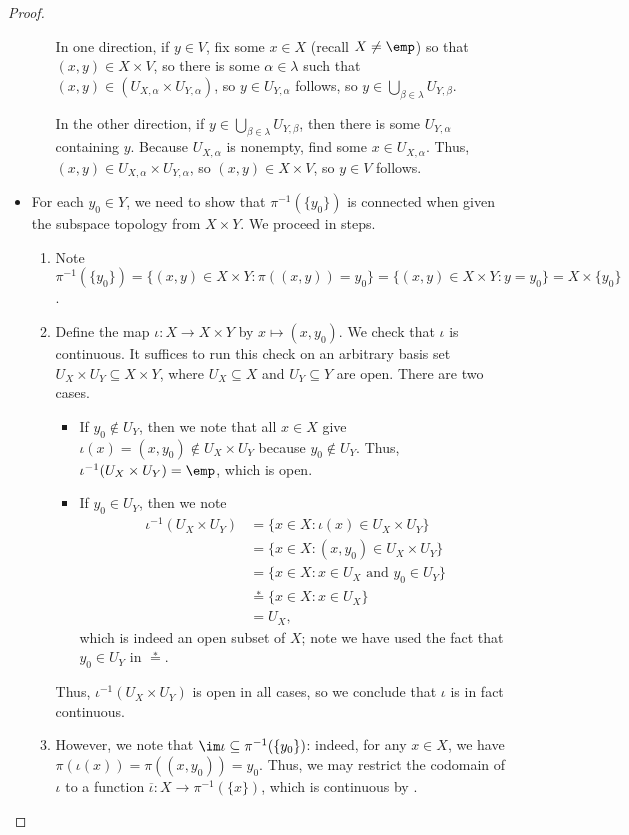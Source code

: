 \documentclass[../notes.tex]{subfiles}
\begin{document}
\begin{proof}
\begin{itemize}
\begin{itemize}
			In one direction, if $y\in V$, fix some $x\in X$ (recall $X\ne\emp$) so that $(x,y)\in X\times V$, so there is some $\alpha\in\lambda$ such that $(x,y)\in(U_{X,\alpha}\times U_{Y,\alpha})$, so $y\in U_{Y,\alpha}$ follows, so $y\in\bigcup_{\beta\in\lambda}U_{Y,\beta}$.

			In the other direction, if $y\in\bigcup_{\beta\in\lambda}U_{Y,\beta}$, then there is some $U_{Y,\alpha}$ containing $y$. Because $U_{X,\alpha}$ is nonempty, find some $x\in U_{X,\alpha}$. Thus, $(x,y)\in U_{X,\alpha}\times U_{Y,\alpha}$, so $(x,y)\in X\times V$, so $y\in V$ follows.
		\end{itemize}
		\item For each $y_0\in Y$, we need to show that $\pi^{-1}(\{y_0\})$ is connected when given the subspace topology from $X\times Y$. We proceed in steps.
		\begin{enumerate}
			\item Note $\pi^{-1}(\{y_0\})=\{(x,y)\in X\times Y:\pi((x,y))=y_0\}=\{(x,y)\in X\times Y:y=y_0\}=X\times\{y_0\}$.
			\item {Define the map $\iota\colon X\to X\times Y$ by $x\mapsto(x,y_0)$.} We check that $\iota$ is continuous. It suffices to run this check on an arbitrary basis set $U_X\times U_Y\subseteq X\times Y$, where $U_X\subseteq X$ and $U_Y\subseteq Y$ are open. There are two cases.
			\begin{itemize}
				\item If $y_0\notin U_Y$, then we note that all $x\in X$ give $\iota(x)=(x,y_0)\notin U_X\times U_Y$ because $y_0\notin U_Y$. Thus, $\iota^{-1}(U_X\times U_Y)=\emp$, which is open.
				\item If $y_0\in U_Y$, then we note
				\begin{align*}
					\iota^{-1}(U_X\times U_Y) &= \{x\in X:\iota(x)\in U_X\times U_Y\} \\
					&= \{x\in X:(x,y_0)\in U_X\times U_Y\} \\
					&= \{x\in X:x\in U_X\text{ and }y_0\in U_Y\} \\
					&\stackrel*= \{x\in X:x\in U_X\} \\
					&= U_X,
				\end{align*}
				which is indeed an open subset of $X$; note we have used the fact that $y_0\in U_Y$ in $\stackrel*=$.
			\end{itemize}
			Thus, $\iota^{-1}(U_X\times U_Y)$ is open in all cases, so we conclude that $\iota$ is in fact continuous.
			\item However, we note that $\im\iota\subseteq\pi^{-1}(\{y_0\})$: indeed, for any $x\in X$, we have $\pi(\iota(x))=\pi((x,y_0))=y_0$. Thus, we may restrict the codomain of $\iota$ to a function $\overline\iota\colon X\to\pi^{-1}(\{x\})$, which is continuous by .

\end{enumerate}
\end{itemize}
\end{proof}
\end{document}
